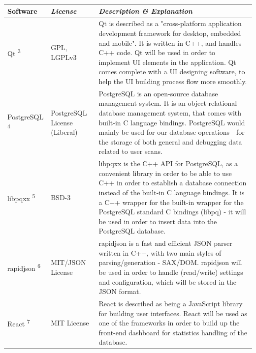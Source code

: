 \documentclass[conference]{IEEEtran}
\begin{document}
\begin{table}[htbp!]\normalsize
\begin{center}
\begin{tabular}{|p{1.5cm}|p{1.5cm}|p{4.7cm}|}
\hline
\textbf{Software} & \textbf{\textit{License}}& \textbf{\textit{Description \& Explanation}}\\
\hline
Qt \textsuperscript{3} & GPL, LGPLv3 &
Qt is described as a "cross-platform application development framework for desktop, embedded and mobile". It is written in C++, and handles C++ code. \newline\newline
Qt will be used in order to implement UI elements in the application. Qt comes complete with a UI designing software, to help the UI building process flow more smoothly.
\\ \hline
PostgreSQL \textsuperscript{4} & PostgreSQL License (Liberal) &
PostgreSQL is an open-source database management system. It is an object-relational database management system, that comes with built-in C language bindings.\newline\newline
PostgreSQL would mainly be used for our database operations - for the storage of both general and debugging data related to user scans.
\\ \hline
libpqxx \textsuperscript{5} & BSD-3 &
libpqxx is the C++ API for PostgreSQL, as a convenient library in order to be able to use C++ in order to establish a database connection instead of the built-in C language bindings.\newline\newline
It is a C++ wrapper for the built-in wrapper for the PostgreSQL standard C bindings (libpq) - it will be used in order to insert data into the PostgreSQL database.
\\ \hline
rapidjson \textsuperscript{6} & MIT/JSON License &
rapidjson is a fast and efficient JSON parser written in C++, with two main styles of parsing/generation - SAX/DOM.\newline\newline
rapidjson will be used in order to handle (read/write) settings and configuration, which will be stored in the JSON format.
\\ \hline
React \textsuperscript{7} & MIT License &
React is described as being a JavaScript library for building user interfaces.\newline\newline
React will be used as one of the frameworks in order to build up the front-end dashboard for statistics handling of the database.
\\ \hline
\end{tabular}
\label{tab1}
\end{center}
\end{table}
\end{document}
